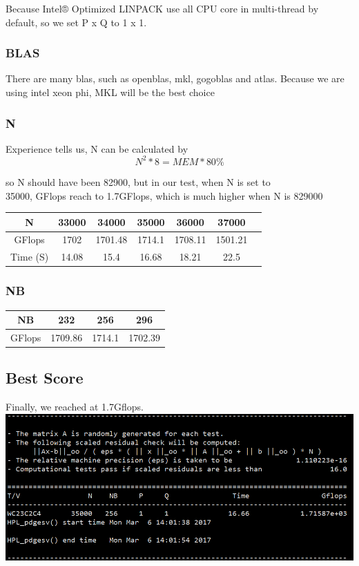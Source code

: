 \documentclass[conference,compsoc]{appendix/report}
\begin{document}
Because Intel® Optimized LINPACK use all CPU core in multi-thread
by default, so we set P x Q to 1 x 1. \\

\subsubsection{BLAS}
There are many blas, such as openblas, mkl, gogoblas and atlas.
Because we are using intel xeon phi, MKL will be the best choice \\

\subsubsection{N}
Experience tells us, N can be calculated by 
\[ N^2 * 8 = MEM * 80\% \]

so N should have been  82900, but in our test, when N is set to \\
35000, GFlops reach to 1.7GFlops, which is much higher when N is 829000 \\

\noindent \begin{tabular}{|c|c|c|c|c|c|c|}
\hline
N &  33000 & 34000 & 35000 & 36000 & 37000  \\
\hline
GFlops  &1702 &1701.48 &1714.1 &1708.11 &1501.21 \\
\hline
Time (S) &14.08 &15.4 &16.68 &18.21 &22.5 \\
\hline 
\end{tabular}
\newline
\newline
\par
\subsubsection{NB}
\noindent \begin{tabular}{|c|c|c|c|}
\hline
NB & 232 & 256 & 296 \\
\hline
GFlops & 1709.86 & 1714.1 & 1702.39 \\
\hline
\end{tabular}

\subsection{Best Score}
Finally, we reached at 1.7Gflops.  \\
\includegraphics[scale=0.35]{appendix/hpl.png}
\end{document}

